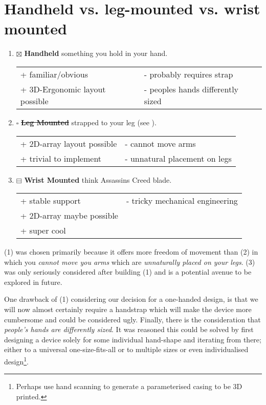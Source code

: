 \documentclass[logo,bsc,singlespacing,parskip]{infthesis}
\begin{document}
\section{Handheld vs. leg-mounted vs. wrist mounted}
\label{sec:org4fa5439}
\begin{enumerate}
\item{$\boxtimes$} \textbf{Handheld} something you hold in your hand.
\begin{longtable}{|p{6.25cm}|p{6.25cm}|}
\hline
+ familiar/obvious & - probably requires strap\\
+ 3D-Ergonomic layout possible & - peoples hands differently sized\\
\hline
\end{longtable}
\item{$\square$} \sout{\textbf{Leg Mounted}} strapped to your leg (see \autocite{SimulaVR2021}).
\begin{longtable}{|p{6.25cm}|p{6.25cm}|}
\hline
+ 2D-array layout possible & - cannot move arms\\
+ trivial to implement & - unnatural placement on legs\\
\hline
\end{longtable}
\item{$\boxminus$} \textbf{Wrist Mounted} think Assassins Creed blade.
\begin{longtable}{|p{6.25cm}|p{6.25cm}|}
\hline
+ stable support & - tricky mechanical engineering\\
+ 2D-array maybe possible & \\
+ super cool & \\
\hline
\end{longtable}
\end{enumerate}

(1) was chosen primarily because it offers more freedom of movement than (2) in which you \emph{cannot move you arms} which are \emph{unnaturally placed on your legs}.
(3) was only seriously considered after building (1) and is a potential avenue to be explored in future.

One drawback of (1) considering our decision for a one-handed design, is that we will now almost certainly require a handstrap which will make the device more cumbersome and  could be considered ugly.
Finally, there is the consideration that \emph{people's hands are differently sized}.
It was reasoned this could be solved by first designing a device solely for some individual hand-shape and iterating from there; either to a universal one-size-fits-all or to multiple sizes or even individualised design\footnote{Perhaps use hand scanning to generate a parameterised casing to be 3D printed.}.
\end{document}
